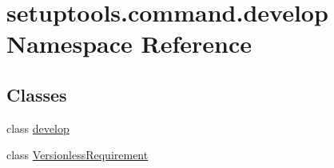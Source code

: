 \hypertarget{namespacesetuptools_1_1command_1_1develop}{}\section{setuptools.\+command.\+develop Namespace Reference}
\label{namespacesetuptools_1_1command_1_1develop}
\subsection*{Classes}
\begin{DoxyCompactItemize}
\item 
class \hyperlink{classsetuptools_1_1command_1_1develop_1_1develop}{develop}
\item 
class \hyperlink{classsetuptools_1_1command_1_1develop_1_1VersionlessRequirement}{Versionless\+Requirement}
\end{DoxyCompactItemize}

